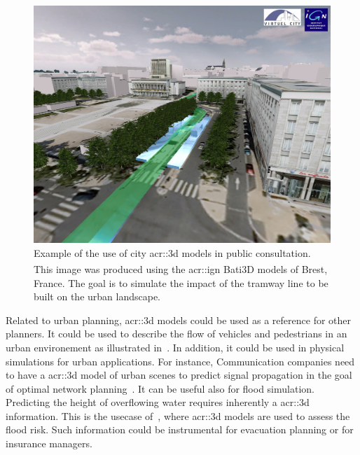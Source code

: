             \begin{figure}[htpb]
                \centering
                \includegraphics[width=\textwidth]{images/3d_model_applications/brest_tramway}
                \caption{
                    \label{fig::public_consultation} Example of the use of city \gls{acr::3d} models in public consultation.
                    This image was produced using the \gls{acr::ign} Bati3D\textsuperscript{\textregistered} models of Brest, France.
                    The goal is to simulate the impact of the tramway line to be built on the urban landscape.
                }
            \end{figure}
            Related to urban planning, \gls{acr::3d} models could be used as a reference for other planners.
            It could be used to describe the flow of vehicles and pedestrians in an urban environement as illustrated in~\textcite{Vanhoey:2017:VVS:3084363.3085085}.
            In addition, it could be used in physical simulations for urban applications.
            For instance, Communication companies need to have a \gls{acr::3d} model of urban scenes to predict signal propagation in the goal of optimal network planning~\parencite{yun2007radio}.
            It can be useful also for flood simulation.
            Predicting the height of overflowing water requires inherently a \gls{acr::3d} information.
            This is the usecase of~\textcite{varduhn2015multi}, where \gls{acr::3d} models are used to assess the flood risk.
            Such information could be instrumental for evacuation planning or for insurance managers.
